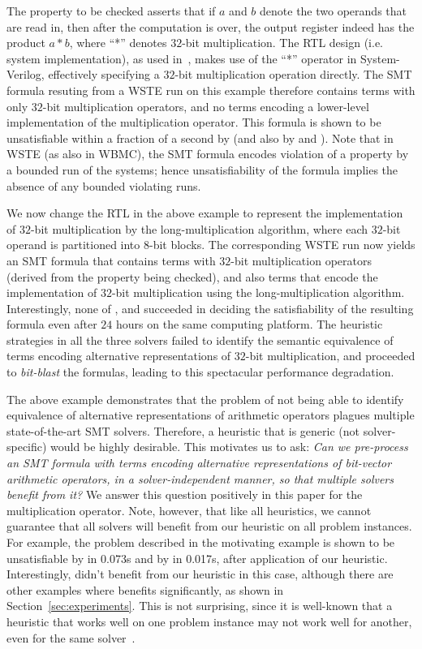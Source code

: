 The property to be checked asserts that if $a$ and $b$ denote the two
operands that are read in, then after the computation is over, the
output register indeed has the product $a * b$, where ``*'' denotes
$32$-bit multiplication.  The RTL design (i.e. system implementation),
as used in~\cite{wste}, makes use of the ``*'' operator in
System-Verilog, effectively specifying a $32$-bit multiplication
operation directly.  The SMT formula resuting from a WSTE run on this
example therefore contains terms with only $32$-bit multiplication
operators, and no terms encoding a lower-level implementation of the
multiplication operator.  This formula is shown to be unsatisfiable
within a fraction of a second by {\boolector} (and also by {\cvcfour}
and {\zthree}).  Note that in WSTE (as also in WBMC), the SMT formula
encodes violation of a property by a bounded run of the systems; hence
unsatisfiability of the formula implies the absence of any bounded
violating runs.

We now change the RTL in the above example to represent the
implementation of $32$-bit multiplication by the long-multiplication
algorithm, where each $32$-bit operand is partitioned into $8$-bit
blocks.  The corresponding WSTE run now yields an SMT formula that
contains terms with $32$-bit multiplication operators (derived from
the property being checked), and also terms that encode the
implementation of $32$-bit multiplication using the
long-multiplication algorithm.  Interestingly, none of {\boolector},
{\cvcfour} and {\zthree} succeeded in deciding the satisfiability of
the resulting formula even after $24$ hours on the same computing
platform.  The heuristic strategies in all the three solvers failed to
identify the semantic equivalence of terms encoding alternative
representations of $32$-bit multiplication, and proceeded
to \emph{bit-blast} the formulas, leading to this spectacular
performance degradation.

The above example demonstrates that the problem of not being able to
identify equivalence of alternative representations of arithmetic
operators plagues multiple state-of-the-art SMT solvers.  Therefore, a
heuristic that is generic (not solver-specific) would be highly
desirable.  This motivates us to ask: \emph{Can we pre-process an SMT
formula with terms encoding alternative representations of bit-vector
arithmetic operators, in a solver-independent manner, so that multiple
solvers benefit from it?}  We answer this question positively in this
paper for the multiplication operator.  Note, however, that like all
heuristics, we cannot guarantee that all solvers will benefit from our
heuristic on all problem instances.  For example, the problem
described in the motivating example is shown to be unsatisfiable by
{\zthree} in 0.073s and by {\cvcfour} in 0.017s, after application of
our heuristic. Interestingly, {\boolector} didn't benefit from our
heuristic in this case, although there are other examples where
{\boolector} benefits significantly, as shown in
Section~\ref{sec:experiments}.  This is not surprising, since it is
well-known that a heuristic that works well on one problem instance
may not work well for another, even for the same
solver~\cite{deMoura2013}.

